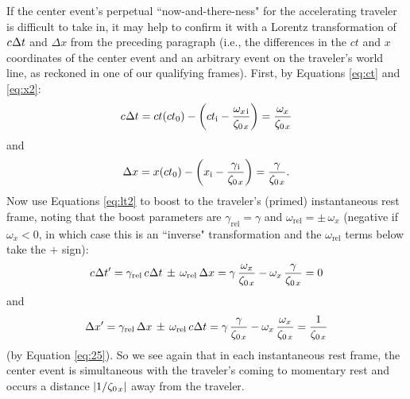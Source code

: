 \documentclass[12pt]{article}
\begin{document}
If the center event's perpetual ``now-and-there-ness" for the accelerating traveler is difficult to take in, it may help to confirm it with a Lorentz transformation of $c \mkern.5mu \Delta t $ and $\Delta x$ from the preceding paragraph (i.e., the differences in the $ct$ and $x$ coordinates of the center event and an arbitrary event on the traveler's world line, as reckoned in one of our qualifying frames). First, by Equations \ref{eq:ct} and \ref{eq:x2}:
\begin{equation*}
c \mkern.5mu \Delta t = ct(ct_0) - \left( ct_{\mathrm{i}} - \dfrac{\omega_{x \mkern2mu \textrm{i} }}{ \zeta_{0 \mkern2mu x}} \right) = \dfrac{\omega_x}{ \zeta_{0 \mkern2mu x}}
\end{equation*}
and
\begin{equation*}
\Delta x = x(ct_0) - \left( x_{\mathrm{i}} - \dfrac{\gamma_{\mkern1mu \textrm{i} }}{ \zeta_{0 \mkern2mu x}} \right) = \dfrac{\gamma}{ \zeta_{0 \mkern2mu x}} .
\end{equation*}
Now use Equations \ref{eq:lt2} to boost to the traveler's (primed) instantaneous rest frame, noting that the boost parameters are $\gamma_{\mathrm{rel}} = \gamma$ and $\omega_{\mathrm{rel}} = \pm \, \omega_x$ (negative if $\omega_x < 0$, in which case this is an ``inverse" transformation and the $\omega_{\textrm{rel}}$ terms below take the $+$ sign):
\begin{equation*}
c \mkern.5mu \Delta t^\prime = \gamma_{\textrm{rel}} \, c \mkern.5mu \Delta t \, \pm \, \omega_{\textrm{rel}} \, \Delta x = \gamma \, \dfrac{\omega_x}{ \zeta_{0 \mkern2mu x}} - \omega_x \, \dfrac{\gamma}{ \zeta_{0 \mkern2mu x}} = 0
\end{equation*}
and
\begin{equation*}
\Delta x^\prime = \gamma_{\textrm{rel}} \, \Delta x \, \pm \, \omega_{\textrm{rel}} \, c \mkern.5mu \Delta t = \gamma \, \dfrac{\gamma}{ \zeta_{0 \mkern2mu x}} - \omega_x \, \dfrac{\omega_x}{ \zeta_{0 \mkern2mu x}} = \dfrac{1}{ \zeta_{0 \mkern2mu x}}
\end{equation*}
(by Equation \ref{eq:25}). So we see again that in each instantaneous rest frame, the center event is simultaneous with the traveler's coming to momentary rest and occurs a distance $|1 / \zeta_{0 \mkern2mu x}|$ away from the traveler.
\end{document}
